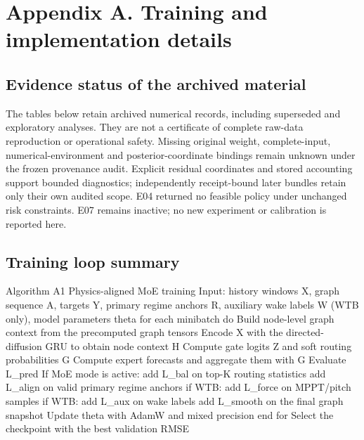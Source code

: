 \documentclass[
  journal]{IEEEtran}
\author{}
\date{}
\newenvironment{Shaded}{}{}
\newcommand{\NormalTok}[1]{#1}
\begin{document}
\section*{Appendix A. Training and implementation
details}\label{appendix-a.-training-and-implementation-details}

\FloatBarrier

\subsection*{Evidence status of the archived
material}\label{evidence-status-of-the-archived-material}

The tables below retain archived numerical records, including superseded
and exploratory analyses. They are not a certificate of complete
raw-data reproduction or operational safety. Missing original weight,
complete-input, numerical-environment and posterior-coordinate bindings
remain unknown under the frozen provenance audit. Explicit residual
coordinates and stored accounting support bounded diagnostics;
independently receipt-bound later bundles retain only their own audited
scope. E04 returned no feasible policy under unchanged risk constraints.
E07 remains inactive; no new experiment or calibration is reported here.

\subsection*{Training loop summary}\label{training-loop-summary}

\begin{Shaded}
\begin{Highlighting}[]
\NormalTok{Algorithm A1  Physics{-}aligned MoE training}
\NormalTok{Input: history windows X, graph sequence A, targets Y, primary regime anchors R,}
\NormalTok{       auxiliary wake labels W (WTB only), model parameters theta}
\NormalTok{for each minibatch do}
\NormalTok{    Build node{-}level graph context from the precomputed graph tensors}
\NormalTok{    Encode X with the directed{-}diffusion GRU to obtain node context H}
\NormalTok{    Compute gate logits Z and soft routing probabilities G}
\NormalTok{    Compute expert forecasts and aggregate them with G}
\NormalTok{    Evaluate L\_pred}
\NormalTok{    If MoE mode is active:}
\NormalTok{        add L\_bal on top{-}K routing statistics}
\NormalTok{        add L\_align on valid primary regime anchors}
\NormalTok{        if WTB: add L\_force on MPPT/pitch samples}
\NormalTok{        if WTB: add L\_aux on wake labels}
\NormalTok{        add L\_smooth on the final graph snapshot}
\NormalTok{    Update theta with AdamW and mixed precision}
\NormalTok{end for}
\NormalTok{Select the checkpoint with the best validation RMSE}
\end{Highlighting}
\end{Shaded}
\end{document}

